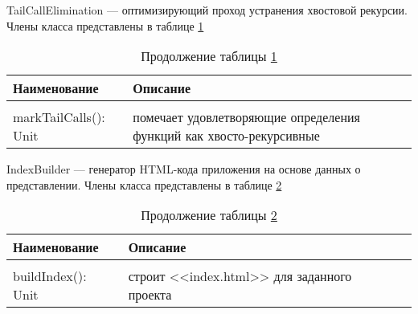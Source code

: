 TailCallElimination --- оптимизирующий проход устранения хвостовой рекурсии. Члены класса представлены в таблице \ref{tab:class24}

\begin{longtable} {| p{8.3cm} | p{8.35cm}l |}
	\caption{Члены класса TailCallElimination}
	\label{tab:class24}\\
	\hline
	\centering Наименование &  \centering Описание & \\
	\hline
	\endfirsthead
	\caption*{Продолжение таблицы \ref{tab:class24}}\\
	\hline
	\endhead
	\hline
	\endfoot
	markTailCalls(): Unit & помечает удовлетворяющие определения функций как хвосто-рекурсивные & \\
\end{longtable}

IndexBuilder --- генератор HTML-кода приложения на основе данных о представлении. Члены класса представлены в таблице \ref{tab:class25}

\begin{longtable} {| p{8.3cm} | p{8.35cm}l |}
	\caption{Члены класса IndexBuilder}
	\label{tab:class25}\\
	\hline
	\centering Наименование &  \centering Описание & \\
	\hline
	\endfirsthead
	\caption*{Продолжение таблицы \ref{tab:class25}}\\
	\hline
	\endhead
	\hline
	\endfoot
	buildIndex(): Unit & строит <<index.html>> для заданного проекта & \\
\end{longtable}

